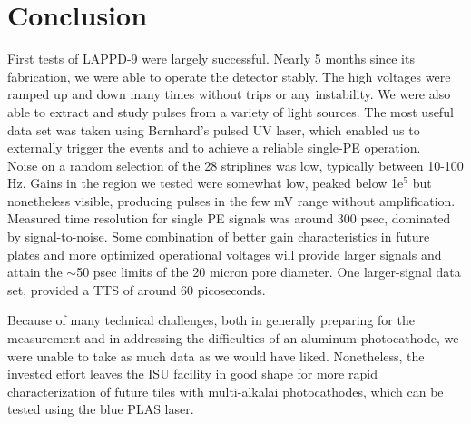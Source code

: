 \documentclass[preprint,12pt]{elsarticle}
\begin{document}
\section{Conclusion}
\label{sec:Conclusion}

\noindent First tests of LAPPD-9 were largely successful. Nearly 5 months since its fabrication, we were able to operate the detector stably. The high voltages were ramped up and down many times without trips or any instability. We were also able to extract and study pulses from a variety of light sources. The most useful data set was taken using Bernhard's pulsed UV laser, which enabled us to externally trigger the events and to achieve a reliable single-PE operation. \\

\noindent Noise on a random selection of the 28 striplines was low, typically between 10-100 Hz. Gains in the region we tested were somewhat low, peaked below 1e$^5$ but nonetheless visible, producing pulses in the few mV range without amplification. Measured time resolution for single PE signals was around 300 psec, dominated by signal-to-noise. Some combination of better gain characteristics in future plates and more optimized operational voltages will provide larger signals and attain the $\sim$50 psec limits of the 20 micron pore diameter. One larger-signal data set, provided a TTS of around 60 picoseconds. %

\noindent Because of many technical challenges, both in generally preparing for the measurement and in addressing the difficulties of an aluminum photocathode, we were unable to take as much data as we would have liked. Nonetheless, the invested effort leaves the ISU facility in good shape for more rapid characterization of future tiles with multi-alkalai photocathodes, which can be tested using the blue PLAS laser.  \\













\end{document}
